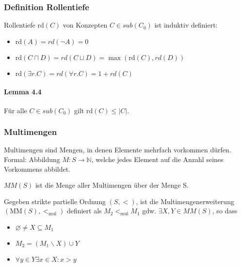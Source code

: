 \subsubsection{Definition Rollentiefe}\label{definition-rollentiefe}

Rollentiefe $\text{rd}\left( C \right)$ von Konzepten
$C \in sub\left( C_{0} \right)$ ist induktiv definiert:

\begin{itemize}
\item
  $\text{rd}\left( A \right) = rd\left( \neg A \right) = 0$
\item
  $\text{rd}\left( C \sqcap D \right) = rd\left( C \sqcup D \right) = \max\left( \text{rd}\left( C \right),rd\left( D \right) \right)$
\item
  $\text{rd}\left( \exists r.C \right) = rd\left( \forall r.C \right) = 1 + rd\left( C \right)$
\end{itemize}

\paragraph{Lemma 4.4}\label{lemma-4.4}

Für alle $C \in sub\left( C_{0} \right)$ gilt
$\text{rd}\left( C \right) \leq \left| C \right|$.

\subsubsection{Multimengen}\label{multimengen}

Multimengen sind Mengen, in denen Elemente mehrfach vorkommen dürfen.
Formal: Abbildung $M:S\mathbb{\rightarrow N}$, welche jedes Element
auf die Anzahl seines Vorkommens abbildet.

$MM(S)$ ist die Menge aller Multimengen über der Menge S.

Gegeben strikte partielle Ordnung $\left( S, < \right)$, ist die
Multimengenerweiterung
$\left( \text{MM}\left( S \right), <_{\text{mul}} \right)$ definiert
als $M_{2} <_{\text{mul}}M_{1}$ gdw. $\exists X,Y \in MM(S)$, so
dass

\begin{itemize}
\item
  $\varnothing \neq X \subseteq M_{1}$
\item
  $M_{2} = \left( M_{1} \smallsetminus X \right) \cup Y$
\item
  $\forall y \in Y\exists x \in X : x > y$
\end{itemize}

